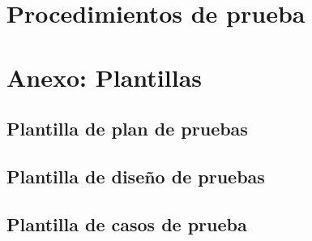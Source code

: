 \documentclass[10pt,a4paper]{article}
\begin{document}
\section{Procedimientos de prueba}

\section{Anexo: Plantillas}
	\subsection{Plantilla de plan de pruebas}

	\subsection{Plantilla de diseño de pruebas}

	\subsection{Plantilla de casos de prueba}

	
\end{document}
